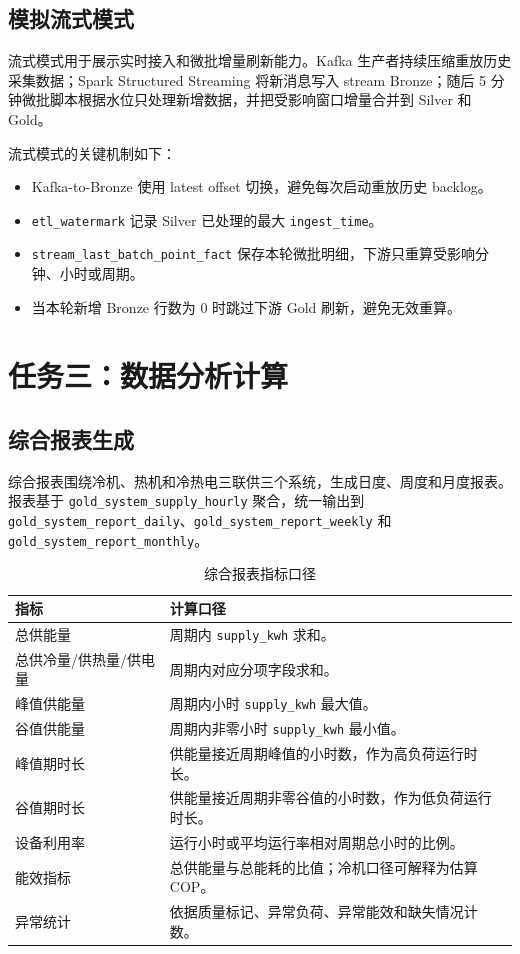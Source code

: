 \documentclass[UTF8,11pt,a4paper]{ctexart}
\newcommand{\code}[1]{\texttt{#1}}
\begin{document}
\subsection{模拟流式模式}

流式模式用于展示实时接入和微批增量刷新能力。Kafka 生产者持续压缩重放历史采集数据；Spark Structured Streaming 将新消息写入 stream Bronze；随后 5 分钟微批脚本根据水位只处理新增数据，并把受影响窗口增量合并到 Silver 和 Gold。



流式模式的关键机制如下：

\begin{itemize}
  \item Kafka-to-Bronze 使用 latest offset 切换，避免每次启动重放历史 backlog。
  \item \code{etl\_watermark} 记录 Silver 已处理的最大 \code{ingest\_time}。
  \item \code{stream\_last\_batch\_point\_fact} 保存本轮微批明细，下游只重算受影响分钟、小时或周期。
  \item 当本轮新增 Bronze 行数为 0 时跳过下游 Gold 刷新，避免无效重算。
\end{itemize}

\section{任务三：数据分析计算}

\subsection{综合报表生成}

综合报表围绕冷机、热机和冷热电三联供三个系统，生成日度、周度和月度报表。报表基于 \code{gold\_system\_supply\_hourly} 聚合，统一输出到 \code{gold\_system\_report\_daily}、\code{gold\_system\_report\_weekly} 和 \code{gold\_system\_report\_monthly}。

\begin{table}[H]
\centering
\small
\begin{tabularx}{\textwidth}{p{3.6cm}Y}
\toprule
指标 & 计算口径 \\
\midrule
总供能量 & 周期内 \code{supply\_kwh} 求和。 \\
总供冷量/供热量/供电量 & 周期内对应分项字段求和。 \\
峰值供能量 & 周期内小时 \code{supply\_kwh} 最大值。 \\
谷值供能量 & 周期内非零小时 \code{supply\_kwh} 最小值。 \\
峰值期时长 & 供能量接近周期峰值的小时数，作为高负荷运行时长。 \\
谷值期时长 & 供能量接近周期非零谷值的小时数，作为低负荷运行时长。 \\
设备利用率 & 运行小时或平均运行率相对周期总小时的比例。 \\
能效指标 & 总供能量与总能耗的比值；冷机口径可解释为估算 COP。 \\
异常统计 & 依据质量标记、异常负荷、异常能效和缺失情况计数。 \\
\bottomrule
\end{tabularx}
\caption{综合报表指标口径}
\end{table}
\end{document}
